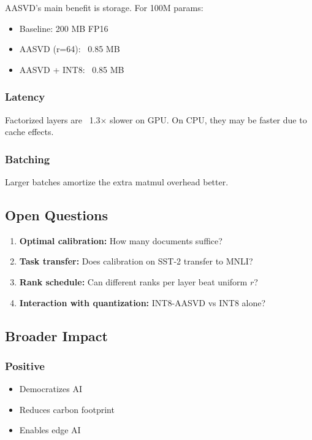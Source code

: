 AASVD's main benefit is storage. For 100M params:
\begin{itemize}
\item Baseline: 200 MB FP16
\item AASVD (r=64): ~0.85 MB
\item AASVD + INT8: ~0.85 MB

\end{itemize}
\subsubsection{Latency}

Factorized layers are ~1.3$\times$ slower on GPU. On CPU, they may 
be faster due to cache effects.

\subsubsection{Batching}

Larger batches amortize the extra matmul overhead better.

\subsection{Open Questions}

\begin{enumerate}
\item \textbf{Optimal calibration:} How many documents suffice?
\item \textbf{Task transfer:} Does calibration on SST-2 transfer to MNLI?
\item \textbf{Rank schedule:} Can different ranks per layer beat uniform $r$?
\item \textbf{Interaction with quantization:} INT8-AASVD vs INT8 alone?

\end{enumerate}
\subsection{Broader Impact}

\subsubsection{Positive}
\begin{itemize}
\item Democratizes AI
\item Reduces carbon footprint
\item Enables edge AI

\end{itemize}
